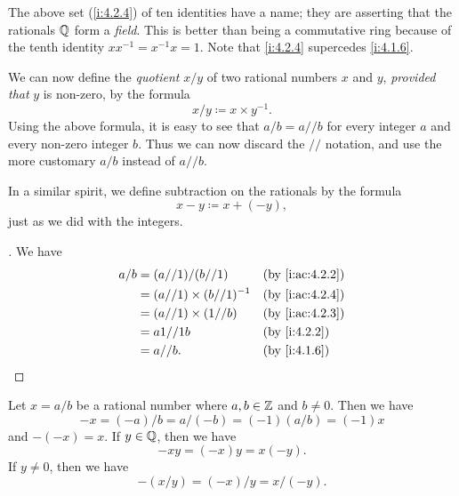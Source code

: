 \begin{rmk}\label{i:4.2.5}
  The above set (\cref{i:4.2.4}) of ten identities have a name;
  they are asserting that the rationals \(\mathbb{Q}\) form a \emph{field}.
  This is better than being a commutative ring because of the tenth identity \(xx^{-1} = x^{-1}x = 1\).
  Note that \cref{i:4.2.4} supercedes \cref{i:4.1.6}.
\end{rmk}

\begin{ac}\label{i:ac:4.2.4}
  We can now define the \emph{quotient} \(x / y\) of two rational numbers \(x\) and \(y\), \emph{provided that} \(y\) is non-zero, by the formula
  \[
    x / y \coloneqq x \times y^{-1}.
  \]
  Using the above formula, it is easy to see that \(a / b = a // b\) for every integer \(a\) and every non-zero integer \(b\).
  Thus we can now discard the \(//\) notation, and use the more customary \(a / b\) instead of \(a // b\).

  In a similar spirit, we define subtraction on the rationals by the formula
  \[
    x - y \coloneqq x + (-y),
  \]
  just as we did with the integers.
\end{ac}

\begin{proof}[]
  We have
  \begin{align*}
    a / b & = (a // 1) / (b // 1)           &  & \by{i:ac:4.2.2} \\
          & = (a // 1) \times (b // 1)^{-1} &  & \by{i:ac:4.2.4} \\
          & = (a // 1) \times (1 // b)      &  & \by{i:ac:4.2.3} \\
          & = a1 // 1b                      &  & \by{i:4.2.2}    \\
          & = a // b.                       &  & \by{i:4.1.6}
  \end{align*}
\end{proof}

\begin{ac}\label{i:ac:4.2.5}
  Let \(x = a / b\) be a rational number where \(a, b \in \mathbb{Z}\) and \(b \neq 0\).
  Then we have
  \[
    -x = (-a) / b = a / (-b) = (-1) (a / b) = (-1) x
  \]
  and \(-(-x) = x\).
  If \(y \in \mathbb{Q}\), then we have
  \[
    -xy = (-x) y = x (-y).
  \]
  If \(y \neq 0\), then we have
  \[
    -(x / y) = (-x) / y = x / (-y).
  \]
\end{ac}

